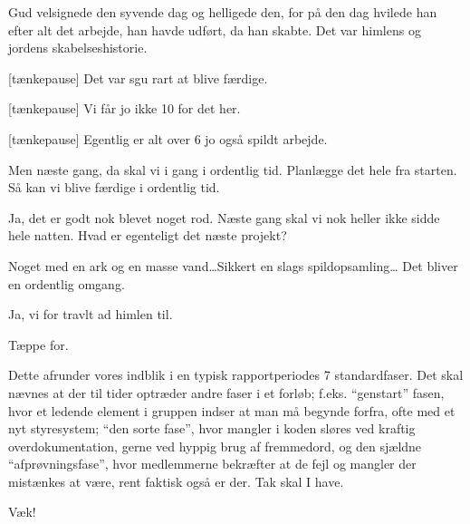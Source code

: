 \documentclass[danish]{article}
\begin{document}
\begin{sketch}
 Gud velsignede den syvende dag og helligede den, for på den dag
hvilede han efter alt det arbejde, han havde udført, da han skabte. Det var
himlens og jordens skabelseshistorie.


[tænkepause] Det var sgu rart at blive færdige.

[tænkepause] Vi får jo ikke 10 for det her.

[tænkepause] Egentlig er alt over 6 jo også spildt arbejde.

 Men næste gang, da skal vi i gang i ordentlig tid. Planlægge det hele
fra starten. Så kan vi blive færdige i ordentlig tid.

 Ja, det er godt nok blevet noget rod. Næste gang skal vi nok
heller ikke sidde hele natten. Hvad er egenteligt det næste projekt?

 Noget med en ark og en masse vand\ldots Sikkert en slags
spildopsamling\ldots{} Det bliver en ordentlig omgang.

 Ja, vi for travlt ad himlen til.

\scene Tæppe for.

 Dette afrunder vores indblik i en typisk rapportperiodes 7
standardfaser. Det skal nævnes at der til tider optræder andre faser i et
forløb; f.eks. ``genstart'' fasen, hvor et ledende element i gruppen indser at
man må begynde forfra, ofte med et nyt styresystem; ``den sorte fase'', hvor
mangler i koden sløres ved kraftig overdokumentation, gerne ved hyppig brug af
fremmedord, og den sjældne ``afprøvningsfase'', hvor medlemmerne bekræfter at de
fejl og mangler der mistænkes at være, rent faktisk også er der. Tak skal I have.

\scene Væk!

\end{sketch}
\end{document}

